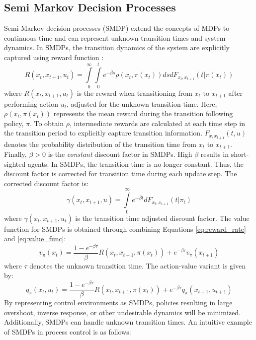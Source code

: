 \subsection{Semi Markov Decision Processes}
Semi-Markov decision processes (SMDP) extend the concepts of MDPs to continuous time and can represent unknown transition times and system dynamics. In SMDPs, the transition dynamics of the system are explicitly captured using reward function \cite{continuous_rl_ref14}:
\begin{equation}
R(x_t, x_{t+1}, u_t) = \int\limits^\infty_0 \int\limits^t_0 e^{-\beta s} \rho(x_t, \pi (x_t))dsdF_{x_t, x_{t+1}}(t | \pi (x_t))
\label{eq:reward_rate}    
\end{equation}
where $R(x_t, x_{t+1}, u_t)$ is the reward when transitioning from $x_t$ to $x_{t+1}$ after performing action $u_t$, adjusted for the unknown transition time. Here, $\rho(x_t, \pi(x_t))$ represents the mean reward during the transition following policy, $\pi$. To obtain $\rho$, intermediate rewards are calculated at each time step in the transition period to explicitly capture transition information. $F_{x, x_{t+1}}(t, u)$ denotes the probability distribution of the transition time from $x_t$ to $x_{t+1}$.  Finally, $\beta > 0$ is the \textit{constant} discount factor in SMDPs. High $\beta$ results in short-sighted agents. In SMDPs, the transition time is no longer constant.  Thus, the discount factor is corrected for transition time during each update step.  The corrected discount factor is:
\begin{equation}
    \gamma(x_t, x_{t+1}, u) = \int\limits^{\infty}_0 e^{-\beta t} dF_{x_t, x_{t+1}}(t | \pi_t)
\end{equation}
where $\gamma (x_t, x_{t+1}, u_t)$ is the transition time adjusted discount factor. The value function for SMDPs is obtained through combining Equations \ref{eq:reward_rate} and \ref{eq:value_func}:
\begin{equation}
v_{\pi}(x_t) = \frac{1 - e^{-\beta \tau}}{\beta} R(x_t, x_{t+1}, \pi(x_t)) + e^{-\beta \tau}v_{\pi}(x_{t+1})
\end{equation}
where $\tau$ denotes the unknown transition time. The action-value variant is given by:
\begin{equation}
    q_{\pi}(x_t, u_t) = \frac{1 - e^{-\beta \tau}}{\beta} R(x_t, x_{t+1}, \pi(x_t)) + e^{-\beta \tau}  q_{\pi}(x_{t+1}, u_{t+1})
\end{equation}
By representing control environments as SMDPs, policies resulting in large overshoot, inverse response, or other undesirable dynamics will be minimized. Additionally, SMDPs can handle unknown transition times.  An intuitive example of SMDPs in process control is as follows:

